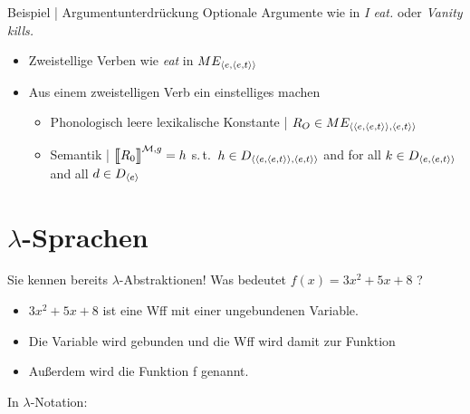 \begin{frame}
  {Beispiel | Argumentunterdrückung}
  \onslide<+->
  \onslide<+->
  Optionale Argumente wie in \alert{\textit{I eat.}} oder \alert{\textit{Vanity kills.}}\\
  \Halbzeile
  \begin{itemize}[<+->]
    \item Zweistellige Verben wie \textit{eat} in \alert{$ME_{{\langle{}e,{\langle{}e,t\rangle}\rangle}}$}
      \Halbzeile
    \item Aus einem zweistelligen Verb ein einstelliges machen
      \Viertelzeile
      \begin{itemize}[<+->]
        \item Phonologisch leere lexikalische Konstante | \alert{$R_O\in ME_{{\langle{}{\langle{}e,{\langle{}e,t\rangle}\rangle},{\langle{}e,t\rangle}\rangle}}$}\\
          \Viertelzeile
        \item Semantik | $\DEM{R_0}=h$ s.\,t.\ \alert{$h\in D_{{\langle{}{\langle{}e,{\langle{}e,t\rangle}\rangle},{\langle{}e,t\rangle}\rangle}}$} and for all $k\in D_{{\langle{}e,{\langle{}e,t\rangle}\rangle}}$ and all $d\in D_{{\langle{}e\rangle}}$\\
      \end{itemize}
  \end{itemize}
\end{frame}

\section{$\lambda$-Sprachen}

\begin{frame}
  {Sie kennen bereits $\lambda$-Abstraktionen!}
  \onslide<+->
  \onslide<+->
  \centering 
  \Large
  Was bedeutet \alert{$f(x)=3x^2+5x+8$} ?\\
  \onslide<+->
  \Zeile
  \raggedright
  \normalsize
  \begin{itemize}[<+->]
    \item \alert{$3x^2+5x+8$} ist eine Wff mit einer ungebundenen Variable.
    \item Die Variable wird gebunden und die Wff \alert{wird damit zur Funktion}\\
    \item Außerdem wird die Funktion \alert{f genannt}.
  \end{itemize}
  \onslide<+->
  \Halbzeile
  \centering 
  \Large
  In $\lambda$-Notation: 
\end{frame}

